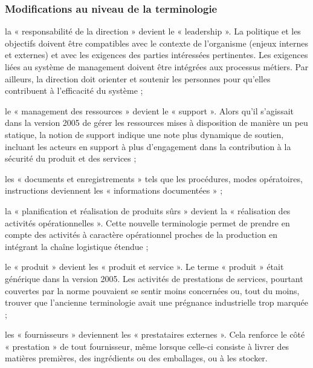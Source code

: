 \begin{spacing}{1.2}
\subsubsection{Modifications au niveau de la terminologie}
la « responsabilité de la direction » devient le « leadership ». La politique et les objectifs doivent être compatibles avec le contexte de l’organisme (enjeux internes et externes) et avec les exigences des parties intéressées pertinentes. Les exigences liées au système de management doivent être intégrées aux processus métiers. Par ailleurs, la direction doit orienter et soutenir les personnes pour qu’elles contribuent à l’efficacité du système ;




le « management des ressources » devient le « support ». Alors qu’il s’agissait dans la version 2005 de gérer les ressources mises à disposition de manière un peu statique, la notion de support indique une note plus dynamique de soutien, incluant les acteurs en support à plus d’engagement dans la contribution à la sécurité du produit et des services ;





les « documents et enregistrements » tels que les procédures, modes opératoires, instructions deviennent les « informations documentées » ;




la « planification et réalisation de produits sûrs » devient la « réalisation des activités opérationnelles ». Cette nouvelle terminologie permet de prendre en compte des activités à caractère opérationnel proches de la production en intégrant la chaîne logistique étendue ;






le « produit » devient les « produit et service ». Le terme « produit » était générique dans la version 2005. Les activités de prestations de services, pourtant couvertes par la norme pouvaient se sentir moins concernées ou, tout du moins, trouver que l’ancienne terminologie avait une prégnance industrielle trop marquée ;





les « fournisseurs » deviennent les « prestataires externes ». Cela renforce le côté « prestation » de tout fournisseur, même lorsque celle-ci consiste à livrer des matières premières, des ingrédients ou des emballages, ou à les stocker.




\end{spacing}
